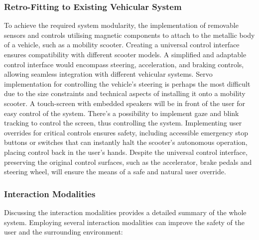 \documentclass[9pt,conference]{IEEEtran}
\begin{document}
\subsubsection{Retro-Fitting to Existing Vehicular System}
To achieve the required system modularity, the implementation of removable sensors and controls utilising magnetic components to attach to the metallic body of a vehicle, such as a mobility scooter. Creating a universal control interface ensures compatibility with different scooter models. A simplified and adaptable control interface would encompass steering, acceleration, and braking controls, allowing seamless integration with different vehicular systems. Servo implementation for controlling the vehicle's steering is perhaps the most difficult due to the size constraints and technical aspects of installing it onto a mobility scooter. A touch-screen with embedded speakers will be in front of the user for easy control of the system. There's a possibility to implement gaze and blink tracking to control the screen, thus controlling the system. Implementing user overrides for critical controls ensures safety, including accessible emergency stop buttons or switches that can instantly halt the scooter's autonomous operation, placing control back in the user's hands. Despite the universal control interface, preserving the original control surfaces, such as the accelerator, brake pedals and steering wheel, will ensure the means of a safe and natural user override.

\subsubsection{Interaction Modalities}
Discussing the interaction modalities provides a detailed summary of the whole system. Employing several interaction modalities can improve the safety of the user and the surrounding environment:
\end{document}
